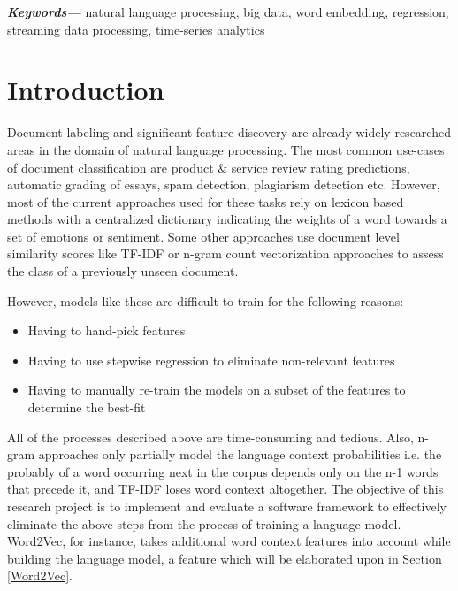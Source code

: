 \documentclass[conference]{IEEEtran}
\begin{document}
\vspace{5mm}

\providecommand{\keywords}[1]{\textbf{\textit{Keywords---}} #1}
\keywords{natural language processing, big data, word embedding, regression, streaming data processing, time-series analytics}

\IEEEpeerreviewmaketitle

\vspace{5mm}

\section{Introduction}
    Document labeling and significant feature discovery are already widely researched areas in the domain of natural language processing.
    The most common use-cases of document classification are product \& service review rating predictions, automatic grading of essays, spam detection, plagiarism detection etc.
    However, most of the current approaches used for these tasks rely on lexicon based methods with a centralized dictionary indicating the weights of a word towards a set of emotions or sentiment.
    Some other approaches use document level similarity scores like TF-IDF or n-gram count vectorization approaches to assess the class of a previously unseen document.

    However, models like these are difficult to train for the following reasons:
    \begin{itemize}
      \item Having to hand-pick features
      \item Having to use stepwise regression to eliminate non-relevant features
      \item Having to manually re-train the models on a subset of the features to determine the best-fit
    \end{itemize}

    All of the processes described above are time-consuming and tedious.
    Also, n-gram approaches only partially model the language context probabilities i.e. the probably of a word occurring next in the corpus depends only on the n-1 words that precede it, and TF-IDF loses word context altogether.
    The objective of this research project is to implement and evaluate a software framework to effectively eliminate the above steps from the process of training a language model. 
    Word2Vec, for instance, takes additional word context features into account while building the language model, a feature which will be elaborated upon in Section \ref{Word2Vec}.
\end{document}
